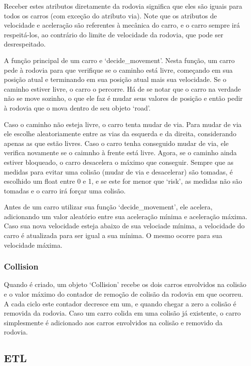 \documentclass{article}
\begin{document}
    Receber estes atributos diretamente da rodovia significa que eles são iguais para todos os carros (com
    exceção do atributo via). Note que os atributos de velocidade e aceleração são referentes à mecânica do
    carro, e o carro sempre irá respeitá-los, ao contrário do limite de velocidade da rodovia, que pode ser
    desrespeitado.

    A função principal de um carro e `decide\_movement'. Nesta função, um carro pede à rodovia para que verifique
    se o caminho está livre, começando em sua posição atual e terminando em sua posição atual mais sua velocidade.
    Se o caminho estiver livre, o carro o percorre. Há de se notar que o carro na verdade não se move sozinho, o que
    ele faz é mudar seus valores de posição e então pedir à rodovia que o mova dentro de seu objeto `road'.

    Caso o caminho não esteja livre, o carro tenta mudar de via. Para mudar de via ele escolhe aleatoriamente entre
    as vias da esquerda e da direita, considerando apenas as que estão livres. Caso o carro tenha conseguido mudar
    de via, ele verifica novamente se o caimnho à frente está livre. Agora, se o caminho ainda estiver bloqueado, o
    carro desacelera o máximo que conseguir. Sempre que as medidas para evitar uma colisão (mudar de via e desacelerar)
    são tomadas, é escolhido um float entre 0 e 1, e se este for menor que `risk', as medidas não são tomadas e o
    carro irá forçar uma colisão.

    Antes de um carro utilizar sua função `decide\_movement', ele acelera, adicionando um valor aleatório entre sua
    aceleração mínima e aceleração máxima. Caso sua nova velocidade esteja abaixo de sua velociade mínima, a velocidade
    do carro é atualizada para ser igual a sua mínima. O mesmo ocorre para sua velocidade máxima.
    
    \subsubsection*{Collision}
    Quando é criado, um objeto `Collision' recebe os dois carros envolvidos na colisão e o valor máximo do contador de
    remoção de colisão da rodovia em que ocorreu. A cada ciclo este contador decresce em um, e quando chegar a zero a
    colisão é removida da rodovia. Caso um carro colida em uma colisão já existente, o carro simplesmente é adicionado
    aos carros envolvidos na colisão e removido da rodovia.

    \subsection*{ETL}
    \lipsum[1]
\end{document}

